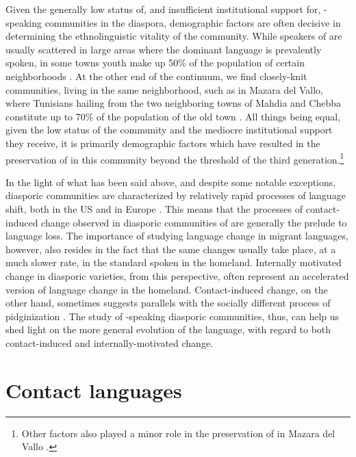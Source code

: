 \documentclass[output=paper]{langsci/langscibook}
\begin{document}
Given the generally low status of, and insufficient institutional support for, -speaking communities in the {diaspora}, demographic factors are often decisive in determining the ethnolinguistic vitality of the community. While speakers of  are usually scattered in large areas where the dominant language is prevalently spoken, in some  towns  youth make up 50\% of the population of certain neighborhoods \citep[50]{Boumans2004}. At the other end of the continuum, we find closely-knit communities, living in the same neighborhood, such as in {Mazara del Vallo}, where Tunisians hailing from the two neighboring towns of Mahdia and Chebba constitute up to 70\% of the population of the old town \citep[27]{Danna2017book}. All things being equal, given the low status of the  community and the mediocre institutional support they receive, it is primarily demographic factors which have resulted in the preservation of  in this community beyond the threshold of the third generation.\footnote{Other factors also played a minor role in the preservation of  in {Mazara del Vallo} \citep[80--81]{Danna2017book}.}

In the light of what has been said above, and despite some notable exceptions,  diasporic communities are characterized by relatively rapid processes of {language shift}, both in the US \citep[29]{Daher1992} and in Europe \citep[282]{BoumansdeRuiter2002}. This means that the processes of contact-induced change observed in diasporic communities of  are generally the prelude to language loss. The importance of studying {language change} in migrant languages, however, also resides in the fact that the same changes usually take place, at a much slower rate, in the standard spoken in the homeland. Internally motivated change in diasporic varieties, from this perspective, often represent an accelerated version of {language change} in the homeland. Contact-induced change, on the other hand, sometimes suggests parallels with the socially different process of pidginization \citep[194--195]{GonzoSaltarelli1983}. The study of -speaking diasporic communities, thus, can help us shed light on the more general evolution of the language, with regard to both contact-induced and internally-motivated change.

\section{Contact languages}
\end{document}

